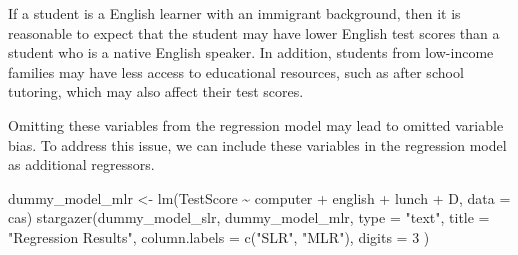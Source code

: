 \documentclass[
  12pt,
  a4paper,
]{scrbook}
\newenvironment{Shaded}{\begin{snugshade}}{\end{snugshade}}
\newcommand{\AttributeTok}[1]{\textcolor[rgb]{0.40,0.45,0.13}{#1}}
\newcommand{\DecValTok}[1]{\textcolor[rgb]{0.68,0.00,0.00}{#1}}
\newcommand{\FunctionTok}[1]{\textcolor[rgb]{0.28,0.35,0.67}{#1}}
\newcommand{\NormalTok}[1]{\textcolor[rgb]{0.00,0.23,0.31}{#1}}
\newcommand{\OtherTok}[1]{\textcolor[rgb]{0.00,0.23,0.31}{#1}}
\newcommand{\SpecialCharTok}[1]{\textcolor[rgb]{0.37,0.37,0.37}{#1}}
\newcommand{\StringTok}[1]{\textcolor[rgb]{0.13,0.47,0.30}{#1}}
\theoremstyle{plain}
\theoremstyle{definition}
\theoremstyle{remark}
\begin{document}
If a student is a English learner with an immigrant background, then it
is reasonable to expect that the student may have lower English test
scores than a student who is a native English speaker. In addition,
students from low-income families may have less access to educational
resources, such as after school tutoring, which may also affect their
test scores.

Omitting these variables from the regression model may lead to omitted
variable bias. To address this issue, we can include these variables in
the regression model as additional regressors.

\begin{Shaded}
\begin{Highlighting}[]
\NormalTok{dummy\_model\_mlr }\OtherTok{\textless{}{-}} \FunctionTok{lm}\NormalTok{(TestScore }\SpecialCharTok{\textasciitilde{}}\NormalTok{ computer }\SpecialCharTok{+}\NormalTok{ english }\SpecialCharTok{+}\NormalTok{ lunch }\SpecialCharTok{+}\NormalTok{ D, }\AttributeTok{data =}\NormalTok{ cas)}
\FunctionTok{stargazer}\NormalTok{(dummy\_model\_slr, dummy\_model\_mlr,}
    \AttributeTok{type =} \StringTok{"text"}\NormalTok{,}
    \AttributeTok{title =} \StringTok{"Regression Results"}\NormalTok{,}
    \AttributeTok{column.labels =} \FunctionTok{c}\NormalTok{(}\StringTok{"SLR"}\NormalTok{, }\StringTok{"MLR"}\NormalTok{),}
    \AttributeTok{digits =} \DecValTok{3}
\NormalTok{)}
\end{Highlighting}
\end{Shaded}
\end{document}
